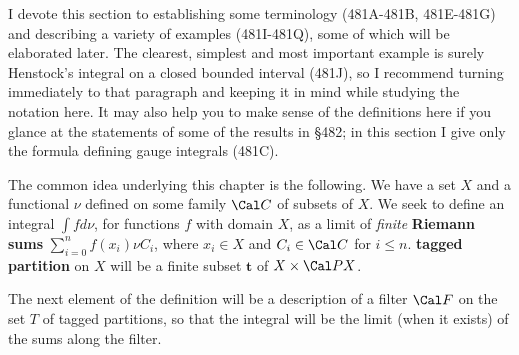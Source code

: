 
\def\Epsilon{\text{E}}
\def\Eta{\text{H}}

\def\chaptername{Gauge integrals}
\def\sectionname{Tagged partitions}


I devote this section to establishing some terminology (481A-481B,
481E-481G) %
and describing a variety of examples
(481I-481Q), %
some of which will be elaborated later.   The clearest, simplest and
most important example is surely Henstock's integral on a closed bounded
interval (481J), so I recommend turning immediately to that paragraph
and keeping it in mind while studying the notation here.   It may also
help you to make sense of the definitions here if you glance at the
statements of some of the results in \S482;   in this section I give
only the formula defining gauge integrals (481C).  %

 The common idea
underlying this chapter is the following.   We
have a set $X$ and a functional $\nu$ defined on some family $\Cal C$ of
subsets of $X$.   We seek to define an integral
$\int fd\nu$, for functions $f$ with domain $X$, as a limit of
{\it finite} {\bf Riemann sums} $\sum_{i=0}^nf(x_i)\nu C_i$, where
$x_i\in X$ and $C_i\in\Cal C$ for $i\le n$.
 {\bf tagged partition} on $X$ will be a finite subset $\pmb{t}$
of $X\times\Cal PX$.

   The next element of the definition will be a description of a
filter $\Cal F$ on the set $T$ of tagged partitions, so that the
integral will be the limit (when it exists) of the sums along the
filter.

